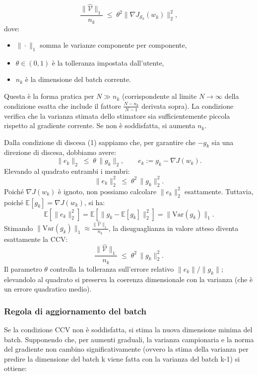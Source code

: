 \documentclass[a4paper,12pt]{article}
\begin{document}
\begin{thmbox}
  \[
    \frac{\|\widehat{\mathcal{V}}\|_1}{n_k} \;\leq\; \theta^2 \|\nabla J_{\mathcal{S}_k}(w_k)\|_2^2,
  \]
  dove:
  \begin{itemize}
    \item $\|\cdot\|_1$ somma le varianze componente per componente,
    \item $\theta \in (0,1)$ \`e la tolleranza impostata dall'utente,
    \item $n_k$ \`e la dimensione del batch corrente.
  \end{itemize}
  Questa \`e la forma pratica per $N \gg n_k$ (corrispondente al limite $N\to\infty$ della condizione esatta che include il fattore $\frac{N-n_k}{N-1}$ derivata sopra). La condizione verifica che la varianza stimata dello stimatore sia sufficientemente piccola rispetto al gradiente corrente. Se non \`e soddisfatta, si aumenta $n_k$.
\end{thmbox}
\begin{notebox}

Dalla condizione di discesa (1) sappiamo che, per garantire che $-g_k$ sia una direzione di discesa, dobbiamo avere:
\[
\|e_k\|_2 \;\le\; \theta\, \|g_k\|_2, \qquad e_k := g_k - \nabla J(w_k).
\]
Elevando al quadrato entrambi i membri:
\[
\|e_k\|_2^2 \;\le\; \theta^2\, \|g_k\|_2^2.
\]
Poiché $\nabla J(w_k)$ è ignoto, non possiamo calcolare $\|e_k\|_2^2$ esattamente. Tuttavia, poiché $\mathbb{E}[g_k] = \nabla J(w_k)$, si ha:
\[
\mathbb{E}\left[\|e_k\|_2^2\right] = \mathbb{E}\left[\|g_k - \mathbb{E}[g_k]\|_2^2\right] = \|\mathrm{Var}(g_k)\|_1.
\]
Stimando $\|\mathrm{Var}(g_k)\|_1 \approx \frac{\|\widehat{\mathcal{V}}\|_1}{n_k}$, la disuguaglianza in valore atteso diventa esattamente la CCV:
\[
\frac{\|\widehat{\mathcal{V}}\|_1}{n_k} \;\le\; \theta^2\, \|g_k\|_2^2.
\]
Il parametro $\theta$ controlla la tolleranza sull'errore relativo $\|e_k\|/\|g_k\|$; elevandolo al quadrato si preserva la coerenza dimensionale con la varianza (che è un errore quadratico medio).
\end{notebox}

\subsubsection{Regola di aggiornamento del batch}

Se la condizione CCV non \`e soddisfatta, si stima la nuova dimensione minima del batch. Supponendo che, per aumenti graduali, la varianza campionaria e la norma del gradiente non cambino significativamente (ovvero la stima della varianza per predire la dimensione del batch k viene fatta con la varianza del batch k-1) si ottiene:
\end{document}
